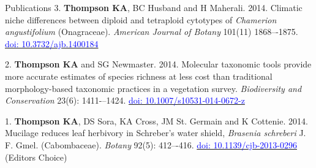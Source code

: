 \documentclass[11pt]{article}
\begin{document}
\begin{rSection}{Publications}
\noindent\hspace{.1cm}3. \textbf{Thompson KA}, BC Husband and H Maherali. 2014. Climatic niche differences between diploid and tetraploid cytotypes of \textit{Chamerion angustifolium} (Onagraceae). \textit{American Journal of Botany} 101(11) 1868–-1875. \href{https://doi.org/10.3732/ajb.1400184}{\textcolor{blue}{doi: 10.3732/ajb.1400184}}

\noindent\hspace{.1cm}2. \textbf{Thompson KA} and SG Newmaster. 2014. Molecular taxonomic tools provide more accurate estimates of species richness at less cost than traditional morphology-based taxonomic practices in a vegetation survey. \textit{Biodiversity and Conservation} 23(6): 1411-–1424. \href{https://doi.org/10.1007/s10531-014-0672-z}{\textcolor{blue}{doi: 10.1007/s10531-014-0672-z}}

\noindent\hspace{.1cm}1. \textbf{Thompson KA}, DS Sora, KA Cross, JM St. Germain and K Cottenie. 2014. Mucilage reduces leaf herbivory in Schreber’s water shield, \textit{Brasenia schreberi} J. F. Gmel. (Cabombaceae). \textit{Botany} 92(5): 412–-416. \href{https://doi.org/10.1139/cjb-2013-0296}{\textcolor{blue}{doi: 10.1139/cjb-2013-0296}}
(Editor\textquotesingle s Choice)

\vspace{0.5em} %


\end{rSection}
\newpage
\end{document}
